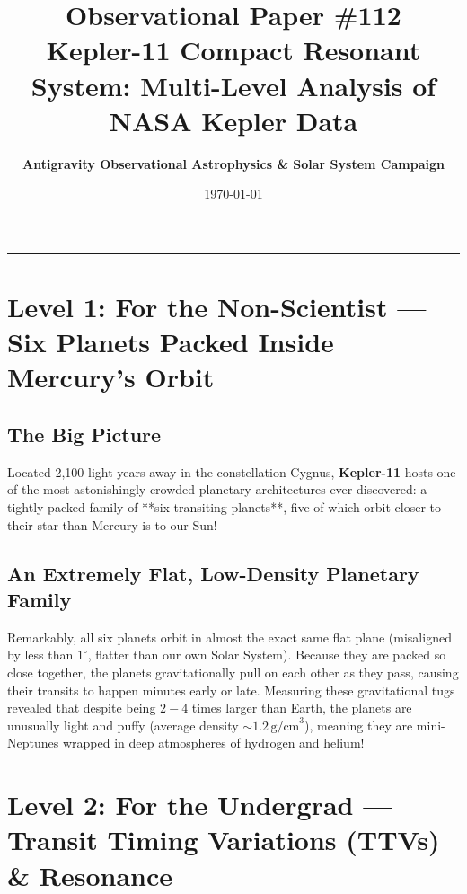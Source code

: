 \documentclass[11pt,a4paper]{article}
\title{\Huge \textbf{Observational Paper \#112}\\ \Large Kepler-11 Compact Resonant System: Multi-Level Analysis of NASA Kepler Data}
\author{\textbf{Antigravity Observational Astrophysics \& Solar System Campaign}}
\date{\today}
\begin{document}
\maketitle

\vspace{-1em}
\begin{center}
\rule{\textwidth}{1.5pt}
\end{center}

\section*{Level 1: For the Non-Scientist — Six Planets Packed Inside Mercury's Orbit}

\subsection*{The Big Picture}
Located 2,100 light-years away in the constellation Cygnus, \textbf{Kepler-11} hosts one of the most astonishingly crowded planetary architectures ever discovered: a tightly packed family of **six transiting planets**, five of which orbit closer to their star than Mercury is to our Sun!

\subsection*{An Extremely Flat, Low-Density Planetary Family}
Remarkably, all six planets orbit in almost the exact same flat plane (misaligned by less than $1^\circ$, flatter than our own Solar System). Because they are packed so close together, the planets gravitationally pull on each other as they pass, causing their transits to happen minutes early or late. Measuring these gravitational tugs revealed that despite being $2 - 4$ times larger than Earth, the planets are unusually light and puffy (average density $\sim 1.2\,\text{g/cm}^3$), meaning they are mini-Neptunes wrapped in deep atmospheres of hydrogen and helium!

\newpage

\section*{Level 2: For the Undergrad — Transit Timing Variations (TTVs) \& Resonance}
\end{document}
